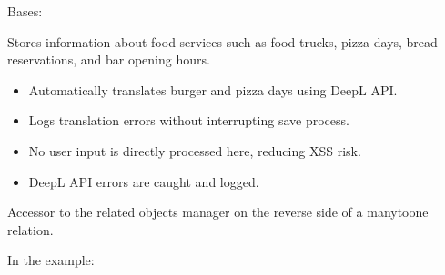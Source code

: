 \documentclass[letterpaper,10pt,english]{sphinxmanual}
\begin{document}
\begin{fulllineitems}
\label{\detokenize{index:core.models.FoodInfo}}
\pysigstartsignatures
\pysiglinewithargsret
{}
{\sphinxparamcomma {}}
{}
\pysigstopsignatures
\sphinxAtStartPar
Bases: 

\sphinxAtStartPar
Stores information about food services such as food trucks, pizza days,
bread reservations, and bar opening hours.
\begin{description}
\begin{itemize}
\item {} 
\sphinxAtStartPar
Automatically translates burger and pizza days using DeepL API.

\item {} 
\sphinxAtStartPar
Logs translation errors without interrupting save process.

\end{itemize}

\begin{itemize}
\item {} 
\sphinxAtStartPar
No user input is directly processed here, reducing XSS risk.

\item {} 
\sphinxAtStartPar
DeepL API errors are caught and logged.

\end{itemize}

\end{description}

\begin{fulllineitems}
\label{\detokenize{index:core.models.FoodInfo.translations}}
\pysigstartsignatures
\pysigline
{}
\pysigstopsignatures
\sphinxAtStartPar
Accessor to the related objects manager on the reverse side of a
many\sphinxhyphen{}to\sphinxhyphen{}one relation.

\sphinxAtStartPar
In the example:

\begin{sphinxVerbatim}[commandchars=\\\{\}]
       
\end{sphinxVerbatim}


\end{fulllineitems}
\end{fulllineitems}
\end{document}
